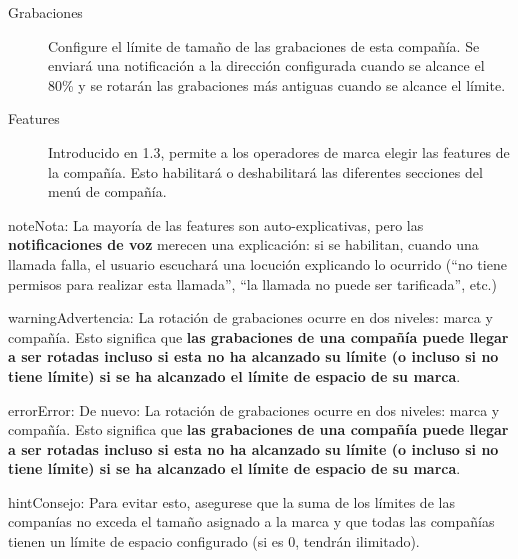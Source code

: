 \documentclass[letterpaper,10pt,spanish]{sphinxmanual}
\begin{document}
\begin{description}
\item[{Grabaciones}] \leavevmode{}\label{internal_calls/brand_portal:term-recordings}
Configure el límite de tamaño de las grabaciones de esta compañía. Se enviará una notificación a la dirección configurada cuando se alcance el 80\% y se rotarán las grabaciones más antiguas cuando se alcance el límite.

\item[{Features}] \leavevmode{}\label{internal_calls/brand_portal:term-features}
Introducido en 1.3, permite a los operadores de marca elegir las features de la compañía. Esto habilitará o deshabilitará las diferentes secciones del menú de compañía.

\end{description}

\begin{notice}{note}{Nota:}
La mayoría de las features son auto-explicativas, pero las \textbf{notificaciones de voz} merecen una explicación: si se habilitan, cuando una llamada falla, el usuario escuchará una locución explicando lo ocurrido (``no tiene permisos para realizar esta llamada'', ``la llamada no puede ser tarificada'', etc.)
\end{notice}

\begin{notice}{warning}{Advertencia:}
La rotación de grabaciones ocurre en dos niveles: marca y compañía. Esto significa que \textbf{las grabaciones de una compañía puede llegar a ser rotadas incluso si esta no ha alcanzado su límite (o incluso si no tiene límite) si se ha alcanzado el límite de espacio de su marca}.
\end{notice}

\begin{notice}{error}{Error:}
De nuevo: La rotación de grabaciones ocurre en dos niveles: marca y compañía. Esto significa que \textbf{las grabaciones de una compañía puede llegar a ser rotadas incluso si esta no ha alcanzado su límite (o incluso si no tiene límite) si se ha alcanzado el límite de espacio de su marca}.
\end{notice}

\begin{notice}{hint}{Consejo:}
Para evitar esto, asegurese que la suma de los límites de las companías no exceda el tamaño asignado a la marca y que todas las compañías tienen un límite de espacio configurado (si es 0, tendrán ilimitado).
\end{notice}
\end{document}
